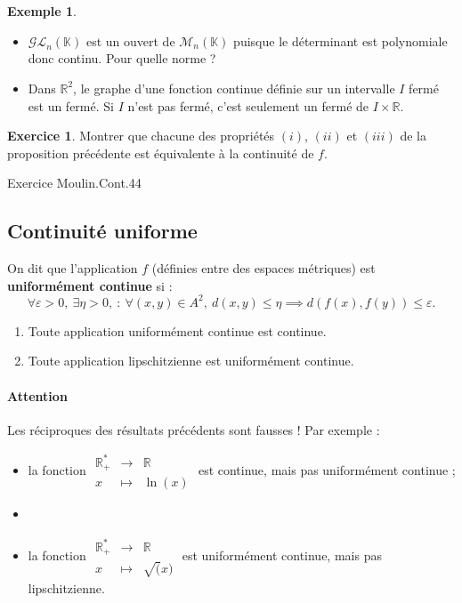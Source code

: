 \documentclass[french]{article}
\newcommand{\R}{\mathbb{R}}
\newcommand{\K}{\mathbb{K}}
\newcommand{\st}{^*}
\theoremstyle{plain}
\theoremstyle{definition}
\newtheorem*{ex}{Exemple}
\newtheorem{exo}{Exercice}
\theoremstyle{remark}
\begin{document}
\begin{ex}
	\begin{itemize}
		\item $\mathcal{GL}_n(\K)$ est un ouvert de $\mathcal{M}_n(\K)$ puisque le déterminant est polynomiale donc continu. Pour quelle norme ?
		\item Dans $\R^2$, le graphe d'une fonction continue définie sur un intervalle $I$ fermé est un fermé. Si $I$ n'est pas fermé, c'est seulement un fermé de $I\times\R$.
	\end{itemize}	
\end{ex}

\begin{exo}
	Montrer que chacune des propriétés $(i)$, $(ii)$ et $(iii)$ de la proposition précédente est équivalente à la continuité de $f$.
\end{exo}

Exercice Moulin.Cont.44

\subsection{Continuité uniforme}

\begin{dfn}
	On dit que l'application $f$ (définies entre des espaces métriques) est \textbf{uniformément continue} si : $$\forall\varepsilon>0,\ \exists\eta>0,\ :\ \forall (x,y)\in A^2,\ d(x,y)\leqslant\eta\implies d(f(x),f(y))\leqslant\varepsilon.$$
\end{dfn}

\begin{thm}{}%
	\begin{enumerate}
		\item Toute application uniformément continue est continue.
		\item Toute application lipschitzienne est uniformément continue.
	\end{enumerate}
\end{thm}

\paragraph{Attention} Les réciproques des résultats précédents sont fausses ! Par exemple :
\begin{itemize}
	\item la fonction $\begin{array}{rcl}
		\R_+\st&\longrightarrow&\R\\
		x&\longmapsto&\ln(x)
	\end{array}$ est continue, mais pas uniformément continue ;
	\item \item la fonction $\begin{array}{rcl}
		\R_+\st&\longrightarrow&\R\\
		x&\longmapsto&\sqrt(x)
	\end{array}$ est uniformément continue, mais pas lipschitzienne.
\end{itemize}
\end{document}
